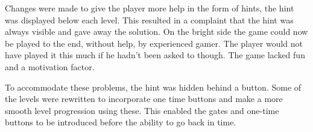Changes were made to give the player more help in the form of hints,
the hint was displayed below each level. This resulted in a complaint
that the hint was always visible and gave away the solution. On the
bright side the game could now be played to the end, without help, by
experienced gamer. The player would not have played it this much if he
hadn't been asked to though. The game lacked fun and a motivation
factor.

To accommodate these problems, the hint was hidden behind a button.
Some of the levels were rewritten to incorporate one time buttons and make
a more smooth level progression using these. This enabled the gates
and one-time buttons to be introduced before the ability to go back in
time.

